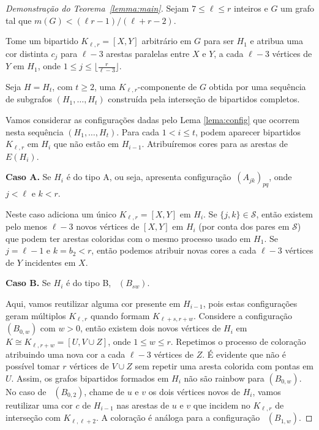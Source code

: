 \documentclass[12pt,a4paper]{book}
\newcommand{\K}{K_{\ell,r}} %
\begin{document}
    \begin{proof}[Demonstração do Teorema~\ref{lemma:main}]
      Sejam $7 \leq \ell \leq r$ inteiros e $G$ um grafo tal que $m(G) < (\ell r - 1)/(\ell+r-2)$.
    
        Tome um bipartido $\K = [X,Y]$ arbitrário em $G$ para ser $H_1$ e atribua uma cor distinta $c_j$ para $\ell-3$ arestas paralelas entre $X$ e $Y$, a cada $\ell-3$ vértices de $Y$ em $H_1$, onde
        $1 \leq j \leq \lfloor \frac{r}{\ell-3}\rfloor$.

        Seja $H = H_t$, com $t \geq 2$, uma $\K$-componente de $G$ obtida por uma sequência de subgrafos $(H_1, \ldots, H_t)$ construída pela interseção de bipartidos completos.

         Vamos considerar as configurações dadas pelo Lema \ref{lema:config} que ocorrem nesta sequência $(H_1, \ldots, H_t)$.
         Para cada $1 < i \leq t$, podem aparecer bipartidos $\K$ em $H_{i}$ que não estão em $H_{i-1}$.
         Atribuíremos cores para as arestas de $E(H_{i})$.

         \medskip \textbf{Caso A.} Se $H_i$ é do tipo A, ou seja, apresenta configuração~\hyperref[configA]{$(A_{jk})_{pq}$}, onde $j < \ell$ e $k < r$.
         
        Neste caso adiciona um único $\K = [X,Y]$ em $H_i$.        
      Se $\{j,k\} \in \mathcal{S}$, então existem pelo menos $\ell-3$ novos vértices de $[X,Y]$ em $H_i$ (por conta dos pares em $\mathcal{S}$) que podem ter arestas coloridas com o mesmo processo usado em $H_1$.        
      Se $j = \ell-1$ e $k=b_2 < r$, então podemos atribuir novas cores a cada $\ell-3$ vértices de $Y$ incidentes em $X$.

        \medskip \textbf{Caso B.} Se $H_i$ é do tipo B, ~\hyperref[configB]{$(B_{sw})$}.
        
        Aqui, vamos reutilizar alguma cor presente em $H_{i-1}$, pois estas configurações geram múltiplos $\K$ quando formam $K_{\ell+s,r+w}$.        
      Considere a configuração ~\hyperref[configB]{$(B_{0,w})$} com $w > 0$, então existem dois novos vértices de
      $H_i$ em $K \cong K_{\ell,r+w} =[U, V \cup Z]$, 
      onde $1 \leq w \leq r$.  
      Repetimos o processo de coloração atribuindo uma nova cor a cada $\ell-3$ 
     vértices de $Z$.
      É evidente que não é possível tomar $r$ vértices de $V \cup Z$ sem repetir uma aresta colorida com pontas em $U$.
      Assim, os grafos bipartidos formados em $H_i$ não são rainbow para $(B_{0,w})$.  
	  No caso de ~\hyperref[configB]{$(B_{0,2})$}, chame de $u$ e $v$ os dois vértices novos de $H_i$, vamos reutilizar uma cor $c$ de $H_{i-1}$ nas arestas de $u$ e $v$ que incidem no $\K$ de interseção com $K_{\ell,\ell+2}$.  
        A coloração é análoga para a configuração ~\hyperref[configB]{$(B_{1,w})$}.


\end{proof}
\end{document}

